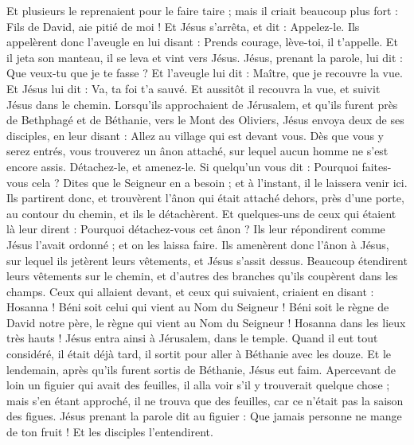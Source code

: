 \begin{multicols}{2}
Et plusieurs le reprenaient pour le faire taire ; mais il criait beaucoup plus fort : Fils de David, aie pitié de moi !
Et Jésus s’arrêta, et dit : Appelez-le. Ils appelèrent donc l’aveugle en lui disant : Prends courage, lève-toi, il t'appelle.
Et il jeta son manteau, il se leva et vint vers Jésus.
Jésus, prenant la parole, lui dit : Que veux-tu que je te fasse ? Et l'aveugle lui dit : Maître, que je recouvre la vue.
Et Jésus lui dit : Va, ta foi t'a sauvé.
Et aussitôt il recouvra la vue, et suivit Jésus dans le chemin.
\VerseOne{}Lorsqu’ils approchaient de Jérusalem, et qu’ils furent près de Bethphagé et de Béthanie, vers le Mont des Oliviers, Jésus envoya deux de ses disciples,
en leur disant : Allez au village qui est devant vous. Dès que vous y serez entrés, vous trouverez un ânon attaché, sur lequel aucun homme ne s’est encore assis. Détachez-le, et amenez-le.
Si quelqu'un vous dit : Pourquoi faites-vous cela ? Dites que le Seigneur en a besoin ; et à l’instant, il le laissera venir ici.
Ils partirent donc, et trouvèrent l'ânon qui était attaché dehors, près d’une porte, au contour du chemin, et ils le détachèrent.
Et quelques-uns de ceux qui étaient là leur dirent : Pourquoi détachez-vous cet ânon ?
Ils leur répondirent comme Jésus l’avait ordonné ; et on les laissa faire.
Ils amenèrent donc l'ânon à Jésus, sur lequel ils jetèrent leurs vêtements, et Jésus s’assit dessus.
Beaucoup étendirent leurs vêtements sur le chemin, et d'autres des branches qu’ils coupèrent dans les champs.
Ceux qui allaient devant, et ceux qui suivaient, criaient en disant : Hosanna ! Béni soit celui qui vient au Nom du Seigneur !
Béni soit le règne de David notre père, le règne qui vient au Nom du Seigneur ! Hosanna dans les lieux très hauts !
Jésus entra ainsi à Jérusalem, dans le temple. Quand il eut tout considéré, il était déjà tard, il sortit pour aller à Béthanie avec les douze.
Et le lendemain, après qu’ils furent sortis de Béthanie, Jésus eut faim.
Apercevant de loin un figuier qui avait des feuilles, il alla voir s'il y trouverait quelque chose ; mais s’en étant approché, il ne trouva que des feuilles, car ce n'était pas la saison des figues.
Jésus prenant la parole dit au figuier : Que jamais personne ne mange de ton fruit ! Et les disciples l'entendirent.

\end{multicols}
